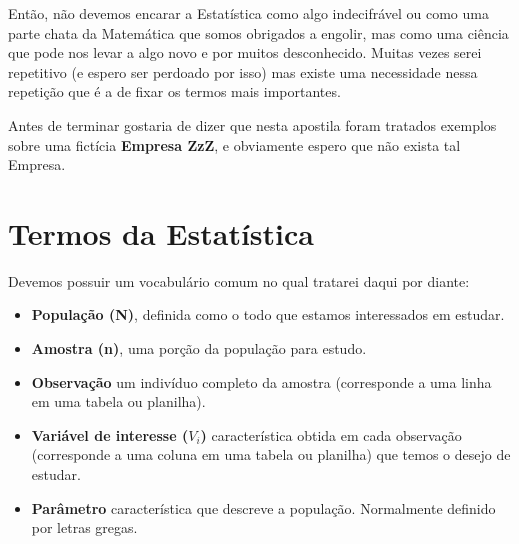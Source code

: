 \documentclass[a4paper,11pt]{article}
\begin{document}
Então, não devemos encarar a Estatística como algo indecifrável ou como uma parte chata da Matemática que somos obrigados a engolir, mas como uma ciência que pode nos levar a algo novo e por muitos desconhecido. Muitas vezes serei repetitivo (e espero ser perdoado por isso) mas existe uma necessidade nessa repetição que é a de fixar os termos mais importantes.

\begin{theo}{}
	Antes de terminar gostaria de dizer que nesta apostila foram tratados exemplos sobre uma fictícia \textbf{Empresa ZzZ}, e obviamente espero que não exista tal Empresa.
\end{theo}

\section{Termos da Estatística}
Devemos possuir um vocabulário comum no qual tratarei daqui por diante:
\begin{itemize}[nolistsep]
	\item \textbf{População (N)}, definida como o todo que estamos interessados em estudar.
	\item \textbf{Amostra (n)}, uma porção da população para estudo.
	\item \textbf{Observação} um indivíduo completo da amostra (corresponde a uma linha em uma tabela ou planilha).
	\item \textbf{Variável de interesse ($V_{i}$)} característica obtida em cada observação (corresponde a uma coluna em uma tabela ou planilha) que temos o desejo de estudar.
	\item \textbf{Parâmetro} característica que descreve a população. Normalmente definido por letras gregas.
\end{itemize}
\end{document}
